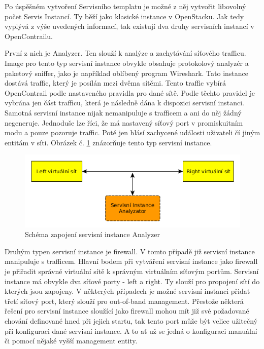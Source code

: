 Po úspěšném vytvoření Servisního templatu je možné z něj vytvořit libovolný počet Servis Instancí.  Ty běží jako klasické instance v OpenStacku. Jak tedy vyplývá z výše uvedených informací, tak existují dva druhy servisních instancí v OpenContrailu. 

První z nich je Analyzer. Ten slouží k analýze a zachytávání síťového trafficu. Image pro tento typ servisní instance obvykle obsahuje protokolový analyzér a paketový sniffer, jako je například oblíbený program Wireshark. Tato instance dostává traffic, který je posílán mezi dvěma sítěmi. Tento traffic vybírá OpenContrail podle nastaveného pravidla pro dané sítě. Podle těchto pravidel je vybrána jen část trafficu, která je následně dána k dispozici servisní instanci. Samotná servisní instance nijak nemanipuluje s trafficem a ani do něj žádný negeneruje. Jednoduše lze říci, že má nastavený síťový port v promiskuitním modu a pouze pozoruje traffic. Poté jen hlásí zachycené události uživateli čí jiným entitám v síti. Obrázek č. \ref{fig:service_instance_anal} znázorňuje tento typ servisní instance.

\begin{figure}[h]
\begin{centering}
\includegraphics[scale=0.63]{images/service_instance_anal}
\par\end{centering}
\caption{Schéma zapojení servisní instance Analyzer\label{fig:service_instance_anal}}
\end{figure}

Druhým typen servisní instance je firewall. V tomto případě již servisní instance manipuluje s trafficem. Hlavní bodem při vytváření servisní instance jako firewall je přiřadit správné virtuální sítě k správným virtuálním síťovým portům. Servisní instance má obvykle dva síťové porty - left a right. Ty slouží pro propojení sítí do kterých jsou zapojeny. V některých případech je možné servisní instanci přidat třetí síťový port, který slouží pro out-of-band management. Přestože některá řešení pro servisní instance sloužící jako firewall mohou mít již své požadované chování definované hned při jejich startu, tak tento port může být velice užitečný při konfiguraci dané servisní instance. A to ať už se jedná o konfiguraci manuální či pomocí nějaké vyšší management entity.

